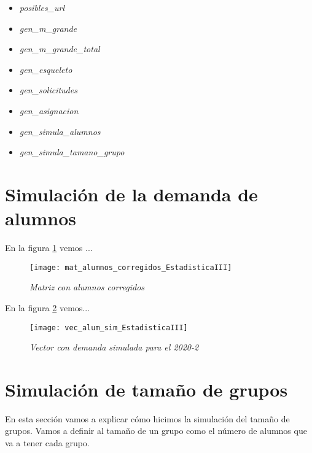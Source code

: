 \begin{itemize}
\item \textit{posibles\_url}

\item \textit{gen\_m\_grande}

\item \textit{gen\_m\_grande\_total}

\item \textit{gen\_esqueleto}

\item \textit{gen\_solicitudes}

\item \textit{gen\_asignacion}

\item \textit{gen\_simula\_alumnos}

\item \textit{gen\_simula\_tamano\_grupo}
\end{itemize}


\section{Simulación de la demanda de alumnos}

En la figura \ref{matAl_corregidos} vemos ...

\begin{figure}[H]
\centering
\texttt{[image: mat\_alumnos\_corregidos\_EstadisticaIII]} %
\caption{\textit{Matriz con alumnos corregidos}}\label{matAl_corregidos}
\end{figure}

En la figura \ref{vec_alum_sim} vemos...

\begin{figure}[H]
\centering
\texttt{[image: vec\_alum\_sim\_EstadisticaIII]} %
\caption{\textit{Vector con demanda simulada para el 2020-2}}\label{vec_alum_sim}
\end{figure}



\section{Simulación de tamaño de grupos} \label{SimTamGpos}

En esta sección vamos a explicar cómo hicimos la simulación del tamaño de grupos. Vamos a definir al tamaño de un grupo como el número de alumnos que va a tener cada grupo.





